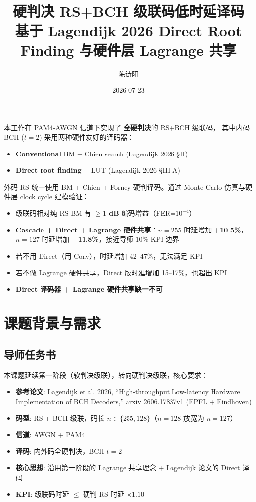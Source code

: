 \documentclass[11pt,a4paper]{article}
\title{硬判决 RS+BCH 级联码低时延译码\\
       {\large 基于 Lagendijk 2026 Direct Root Finding 与硬件层 Lagrange 共享}}
\author{陈诗阳}
\date{2026-07-23}
\begin{document}
\maketitle

\begin{keybox}[title=\textbf{摘要}]
本工作在 PAM4-AWGN 信道下实现了 \textbf{全硬判决}的 RS+BCH 级联码，
其中内码 BCH ($t=2$) 采用两种硬件友好的译码器：
\begin{itemize}[leftmargin=1.5em, itemsep=1pt, topsep=2pt]
\item \textbf{Conventional} BM + Chien search (Lagendijk 2026 §II)
\item \textbf{Direct root finding} + LUT (Lagendijk 2026 §III-A)
\end{itemize}
外码 RS 统一使用 BM + Chien + Forney 硬判译码。通过 Monte Carlo 仿真与硬件层
clock cycle 建模验证：

\begin{itemize}[leftmargin=1.5em, itemsep=1pt, topsep=2pt]
\item 级联码相对纯 RS-BM 有 \textbf{$\geq 1$ dB} 编码增益（FER=$10^{-4}$）
\item \textbf{Cascade + Direct + Lagrange 硬件共享}：$n=255$ 时延增加 \textbf{+10.5\%}，
     $n=127$ 时延增加 \textbf{+11.8\%}，接近导师 10\% KPI 边界
\item 若不用 Direct（用 Conv），时延增加 42--47\%，无法满足 KPI
\item 若不做 Lagrange 硬件共享，Direct 版时延增加 15--17\%，也超出 KPI
\item \textbf{Direct 译码器 + Lagrange 硬件共享缺一不可}
\end{itemize}
\end{keybox}

\tableofcontents

\section{课题背景与需求}

\subsection{导师任务书}

本课题延续第一阶段（软判决级联），转向硬判决级联，核心要求：

\begin{itemize}[leftmargin=1.5em]
\item \textbf{参考论文}: Lagendijk et al. 2026, ``High-throughput Low-latency Hardware Implementation of BCH Decoders,''
   arxiv 2606.17837v1 (EPFL + Eindhoven)
\item \textbf{码型}: RS + BCH 级联，码长 $n \in \{255, 128\}$（$n=128$ 放宽为 $n=127$）
\item \textbf{信道}: AWGN + PAM4
\item \textbf{译码}: 内外码全硬判决，BCH $t=2$
\item \textbf{核心思想}: 沿用第一阶段的 Lagrange 共享理念 + Lagendijk 论文的 Direct 译码
\item \textbf{KPI}: 级联码时延 $\leq$ 硬判 RS 时延 $\times 1.10$
\end{itemize}
\end{document}
